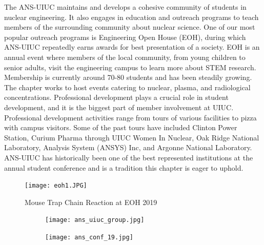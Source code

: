 The ANS-UIUC maintains and develops a cohesive community of students in nuclear engineering. It also engages in education and outreach programs to teach members of the surrounding community about nuclear science. One of our most popular outreach programs is Engineering Open House (EOH), during which ANS-UIUC repeatedly earns awards for best presentation of a society. EOH is an annual event where members of the local community, from young children to senior adults, visit the engineering campus to learn more about STEM research. Membership is currently around 70-80 students and has been steadily growing. The chapter works to host events catering to nuclear, plasma, and radiological concentrations. Professional development plays a crucial role in student development, and it is the biggest part of member involvement at UIUC. Professional development activities range from tours of various facilities to pizza with campus visitors. Some of the past tours have included Clinton Power Station, Curium Pharma through UIUC Women In Nuclear, Oak Ridge National Laboratory, Analysis System (ANSYS) Inc, and Argonne National Laboratory. ANS-UIUC has historically been one of the best represented institutions at the annual student conference and is a tradition this chapter is eager to uphold. 

\begin{figure}[H]
  \centering
  \texttt{[image: eoh1.JPG]}
  \caption{Mouse Trap Chain Reaction at EOH 2019}
\end{figure}

\begin{figure}[H]
  \centering
  \begin{subfigure}{0.5\textwidth}
    \centering
    \texttt{[image: ans\_uiuc\_group.jpg]}
  \end{subfigure}%
  \begin{subfigure}{0.5\textwidth}
    \centering
    \texttt{[image: ans\_conf\_19.jpg]}
  \end{subfigure}   
\end{figure} 

\clearpage

